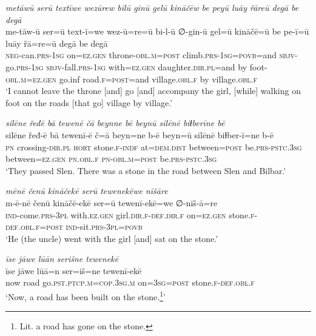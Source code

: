 \ea \label{ŽP.161}
\textit{metāwū serū textīwe wezūrew bilū ginū gelū kināčēw be peyū luāy řāreū degā be degā} \\ 
\gll me-tāw-ū ser=ū text-ī=we wez-ū=re=ū bi-l-ū ∅-gin-ū gel=ū kināčē=ū be pe-ī=ū luāy řā=re=ū degā be degā \\ 
 \textsc{neg-}can\textsc{.prs}\textsc{-\textsc{1sg}} on\textsc{\textsc{=ez.gen}} throne\textsc{-obl}\textsc{.m}\textsc{=\textsc{post}} climb\textsc{.prs}\textsc{-\textsc{1sg}}\textsc{=\textsc{povb}}=and \textsc{sbjv-}go\textsc{.prs}\textsc{-\textsc{1sg}} \textsc{sbjv-}fall\textsc{.prs}\textsc{-\textsc{1sg}} with\textsc{\textsc{=ez.gen}} daughter\textsc{.dir}\textsc{.pl}=and by foot\textsc{-obl}\textsc{.m}\textsc{\textsc{=ez.gen}} go.inf road\textsc{.f}\textsc{=\textsc{post}}=and village\textsc{.obl}\textsc{.f} by village\textsc{.obl}\textsc{.f} \\ 
\glt `I cannot leave the throne [and] go [and] accompany the girl, [while] walking on foot on the roads [that go] village by village.'
\z 
 
\ea \label{ŽP.167}
\textit{silēne řeđē bā tewenē čā beynne bē beynū silēnē biɫberīne bē} \\ 
\gll silēne řeđ-ē bā tewenī-ē č=ā beyn=ne b-ē beyn=ū silēnē biɫber-ī=ne b-ē \\ 
 \textsc{pn} crossing\textsc{-dir}\textsc{.pl} \textsc{hort} stone\textsc{.f}\textsc{-indf} at=\textsc{dem.dist} between\textsc{=\textsc{post}} be\textsc{.prs}\textsc{-pstc}\textsc{.3sg} between\textsc{\textsc{=ez.gen}} \textsc{pn}\textsc{.obl}\textsc{.f} \textsc{pn}\textsc{-obl}\textsc{.m}\textsc{=\textsc{post}} be\textsc{.prs}\textsc{-pstc}\textsc{.3sg} \\ 
\glt `They passed Slen. There was a stone in the road between Slen and Bilbar.'
\z 
 
\ea \label{ŽP.169}
\textit{mēnē čenū kināčekē serū tewenekēwe nīšāre} \\ 
\gll m-ē-nē čenū kināčē-ekē ser=ū tewenī-ekē=we ∅-nīš-ā=re \\ 
 \textsc{ind-}come\textsc{.prs}\textsc{-3pl} with\textsc{.ez.gen} girl\textsc{.dir}\textsc{.f}\textsc{-def}\textsc{.dir}\textsc{.f} on\textsc{\textsc{=ez.gen}} stone\textsc{.f}\textsc{-def}\textsc{.obl}\textsc{.f}\textsc{=\textsc{post}} \textsc{ind-}sit\textsc{.prs}\textsc{-3pl}\textsc{=\textsc{povb}} \\ 
\glt `He (the uncle) went with the girl [and] sat on the stone.'
\z 
 
\ea \label{ŽP.170}
\textit{īse jāwe lūān serišne tewenekē} \\ 
\gll īse jāwe lūā=n ser=iš=ne tewenī-ekē \\ 
 now road go\textsc{.pst}\textsc{.ptcp}\textsc{.m}\textsc{=cop}\textsc{.3sg}\textsc{.m} on\textsc{=3sg}\textsc{=\textsc{post}} stone\textsc{.f}\textsc{-def}\textsc{.obl}\textsc{.f} \\ 
\glt `Now, a road has been built on the stone.\footnote{Lit. a road has gone on the stone.}'
\z 
 
